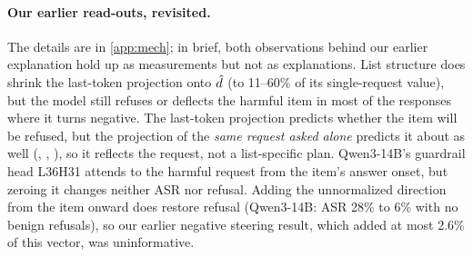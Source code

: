 \paragraph{Our earlier read-outs, revisited.} The details are in \cref{app:mech}; in brief, both observations
behind our earlier explanation hold up as measurements but not as explanations. List structure does shrink the
last-token projection onto $\hat{d}$ (to 11--60\% of its single-request value), but the model still refuses or
deflects the harmful item in most of the responses where it turns negative. The last-token projection predicts
whether the item will be refused, but the projection of the \emph{same request asked alone} predicts it about as
well (\QwenAUCBare, \GemmaAUCBare, \LlamaAUCBare), so it reflects the request, not a list-specific plan. Qwen3-14B's
guardrail head L36H31 attends to the harmful request from the item's answer onset, but zeroing it changes
neither ASR nor refusal. Adding the unnormalized direction from the item onward does restore refusal (Qwen3-14B:
ASR 28\% to 6\% with no benign refusals), so our earlier negative steering result, which added at most 2.6\%
of this vector, was uninformative.
